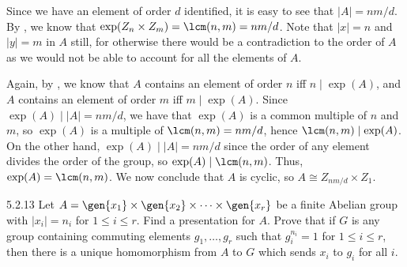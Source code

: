 \begin{sol}[spsol]
    Since we have an element of order $d$ identified, it is easy to see that $|A| = nm/d$.
	By , we know that $\exp(Z_n \times Z_m) = \lcm(n, m) = nm/d$.
	Note that $|x| = n$ and $|y| = m$ in $A$ still, for otherwise there would be a contradiction to the order of $A$ as we would not be able to account for all the elements of $A$.

    Again, by , we know that $A$ contains an element of order $n$ iff $n \mid \exp(A)$, and $A$ contains an element of order $m$ iff $m \mid \exp(A)$.
	Since $\exp(A) \mid |A| = nm/d$, we have that $\exp(A)$ is a common multiple of $n$ and $m$, so $\exp(A)$ is a multiple of $\lcm(n, m) = nm/d$, hence $\lcm(n, m) \mid \exp(A)$.
	On the other hand, $\exp(A) \mid |A| = nm/d$ since the order of any element divides the order of the group, so $\exp(A) \mid \lcm(n, m)$.
	Thus, $\exp(A) = \lcm(n, m)$.
	We now conclude that $A$ is cyclic, so $A \cong Z_{nm/d} \times Z_1$.
\end{sol}

\begin{exercise}{5.2.13}
    Let $A = \gen{x_1} \times \gen{x_2} \times \cdots \times \gen{x_r}$ be a finite Abelian group with $|x_i| = n_i$ for $1 \leq i \leq r$.
	Find a presentation for $A$.
	Prove that if $G$ is any group containing commuting elements $g_1, \ldots, g_r$ such that $g_i^{n_i} = 1$ for $1 \leq i \leq r$, then there is a unique homomorphism from $A$ to $G$ which sends $x_i$ to $g_i$ for all $i$.
\end{exercise}

